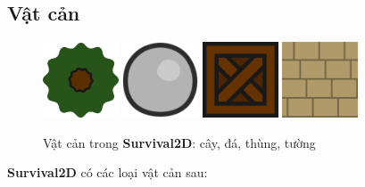 \documentclass[12pt,a4paper]{article}
\begin{document}
  \subsection{Vật cản}
  \begin{figure}[H]
      \centering
      \includegraphics[width=0.2\textwidth]{Img/game_screen_shoot/tree.png}
      \includegraphics[width=0.2\textwidth]{Img/game_screen_shoot/stone_1.png}
      \includegraphics[width=0.2\textwidth]{Img/game_screen_shoot/crate.png}
      \includegraphics[width=0.2\textwidth]{Img/game_screen_shoot/wall.png}
      \caption{Vật cản trong \textbf{Survival2D}: cây, đá, thùng, tường}
  \end{figure}
  \textbf{Survival2D} có các loại vật cản sau:
\end{document}
